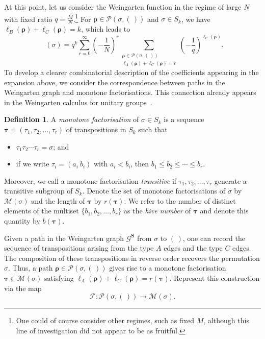 \documentclass[a4paper]{article}
\theoremstyle{plain}
\numberwithin{theorem}{section}
\theoremstyle{definition}
\newtheorem{definition}[theorem]{Definition}
\theoremstyle{remark}
\renewcommand{\leq}{\leqslant}
\newcommand{\SM}{\mathbf{S}}			%
\DeclareMathOperator{\SW}{Wg^{\SM}}		%
\newcommand{\SG}{S} 					%
\begin{document}
At this point, let us consider the Weingarten function in the regime of large $N$ with fixed ratio $q = \frac{M}{N}$.\footnote{One could of course consider other regimes, such as fixed $M$, although this line of investigation did not appear to be as fruitful.} For $\bm{\rho} \in \mathcal{P}(\sigma,(\,))$ and $\sigma \in \SG_k$, we have $\ell_B(\bm{\rho}) + \ell_C(\bm{\rho}) = k$, which leads to
\[
\SW(\sigma) = q^k \sum_{r=0}^\infty \left( -\frac{1}{N} \right)^r \sum_{\substack{\bm{\rho} \in \mathcal{P}(\sigma,(\,)) \\ \ell_A(\bm{\rho}) + \ell_C(\bm{\rho}) = r }} \left( -\frac{1}{q} \right)^{\ell_C(\bm{\rho})}.
\]
To develop a clearer combinatorial description of the coefficients appearing in the expansion above, we consider the correspondence between paths in the Weingarten graph and monotone factorisations. This connection already appears in the Weingarten calculus for unitary groups~\cite{col-mat17}.


\begin{definition} \label{def:monotone}
A {\em monotone factorisation} of $\sigma \in \SG_k$ is a sequence $\bm{\tau} = (\tau_1, \tau_2, \ldots, \tau_r)$ of transpositions in $\SG_k$ such that
\begin{itemize}
\item $\tau_1 \tau_2 \cdots \tau_r = \sigma$; and
\item if we write $\tau_i = (a_i ~ b_i)$ with $a_i < b_i$, then $b_1 \leq b_2 \leq \cdots \leq b_r$.
\end{itemize}
Moreover, we call a monotone factorisation {\em transitive} if $\tau_1, \tau_2, \ldots, \tau_r$ generate a transitive subgroup of $\SG_k$. Denote the set of monotone factorisations of $\sigma$ by $\mathcal{M}(\sigma)$ and the length of $\bm{\tau}$ by $r(\bm{\tau})$. We refer to the number of distinct elements of the multiset $\{b_1, b_2, \ldots, b_r\}$ as the {\em hive number} of $\bm{\tau}$ and denote this quantity by $b(\bm{\tau})$.
\end{definition}


Given a path in the Weingarten graph $\mathcal{G}^\SM$ from $\sigma$ to $(\,)$, one can record the sequence of transpositions arising from the type $A$ edges and the type $C$ edges. The composition of these transpositions in reverse order recovers the permutation $\sigma$. Thus, a path $\bm{\rho} \in \mathcal{P}(\sigma,(\,))$ gives rise to a monotone factorisation $\bm{\tau}\in \mathcal{M}(\sigma)$ satisfying $\ell_A(\bm{\rho}) + \ell_C(\bm{\rho}) = r(\bm{\tau})$. Represent this construction via the map
\[
\mathcal{F}: \mathcal{P}(\sigma,(\,)) \to \mathcal{M}(\sigma).
\]
\end{document}
